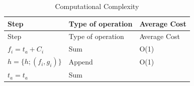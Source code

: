\documentclass[
  12pt,
  a4paperpaper,
]{report}
\begin{document}
\begin{longtable}[]{@{}lll@{}}
\caption{Computational Complexity \label{tab:bigO}}\tabularnewline
\toprule
\begin{minipage}[b]{0.52\columnwidth}\raggedright
Step\strut
\end{minipage} & \begin{minipage}[b]{0.24\columnwidth}\raggedright
Type of operation\strut
\end{minipage} & \begin{minipage}[b]{0.15\columnwidth}\raggedright
Average Cost\strut
\end{minipage}\tabularnewline
\midrule
\endfirsthead
\toprule
\begin{minipage}[b]{0.52\columnwidth}\raggedright
Step\strut
\end{minipage} & \begin{minipage}[b]{0.24\columnwidth}\raggedright
Type of operation\strut
\end{minipage} & \begin{minipage}[b]{0.15\columnwidth}\raggedright
Average Cost\strut
\end{minipage}\tabularnewline
\midrule
\endhead
\begin{minipage}[t]{0.52\columnwidth}\raggedright
\(f_i = t_a + C_i\)\strut
\end{minipage} & \begin{minipage}[t]{0.24\columnwidth}\raggedright
Sum\strut
\end{minipage} & \begin{minipage}[t]{0.15\columnwidth}\raggedright
O(1)\strut
\end{minipage}\tabularnewline
\begin{minipage}[t]{0.52\columnwidth}\raggedright
\(h = \{h; (f_i, g_i )\}\)\strut
\end{minipage} & \begin{minipage}[t]{0.24\columnwidth}\raggedright
Append\strut
\end{minipage} & \begin{minipage}[t]{0.15\columnwidth}\raggedright
O(1)\strut
\end{minipage}\tabularnewline
\begin{minipage}[t]{0.52\columnwidth}\raggedright
\(t_a = t_a\)\strut
\end{minipage} & \begin{minipage}[t]{0.24\columnwidth}\raggedright
Sum\strut
\end{minipage} & \begin{minipage}[t]{0.15\columnwidth}\raggedright

\end{minipage}
\end{longtable}
\end{document}

